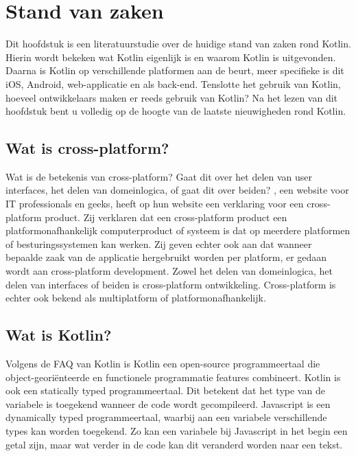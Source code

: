 \chapter{Stand van zaken}
\label{ch:stand-van-zaken}



Dit hoofdstuk is een literatuurstudie over de huidige stand van zaken rond Kotlin. Hierin wordt bekeken wat Kotlin eigenlijk is en waarom Kotlin is uitgevonden. Daarna is Kotlin op verschillende platformen aan de beurt, meer specifieke is dit iOS, Android, web-applicatie en als back-end. Tenslotte het gebruik van Kotlin, hoeveel ontwikkelaars maken er reeds gebruik van Kotlin? Na het lezen van dit hoofdstuk bent u volledig op de hoogte van de laatste nieuwigheden rond Kotlin.

\section{Wat is cross-platform?}
Wat is de betekenis van cross-platform? Gaat dit over het delen van user interfaces, het delen van domeinlogica, of gaat dit over beiden? \textcite{CrossExplain}, een website voor IT professionals en geeks, heeft op hun website een verklaring voor een cross-platform product. Zij verklaren dat een cross-platform product een platformonafhankelijk computerproduct of systeem is dat op meerdere platformen of besturingssystemen kan werken. Zij geven echter ook aan dat wanneer bepaalde zaak van de applicatie hergebruikt worden per platform, er gedaan wordt aan cross-platform development. Zowel het delen van domeinlogica, het delen van interfaces of beiden is cross-platform ontwikkeling. Cross-platform is echter ook bekend als multiplatform of platformonafhankelijk.

\section{Wat is Kotlin?}
\label{sec:kotlin}
Volgens de FAQ van Kotlin \autocite{JetBrainsFAQ} is Kotlin een open-source programmeertaal die object-georiënteerde en functionele programmatie features combineert. Kotlin is ook een statically typed programmeertaal. Dit betekent dat het type van de variabele is toegekend wanneer de code wordt gecompileerd. Javascript is een dynamically typed programmeertaal, waarbij aan een variabele verschillende types kan worden toegekend. Zo kan een variabele bij Javascript in het begin een getal zijn, maar wat verder in de code kan dit veranderd worden naar een tekst.

